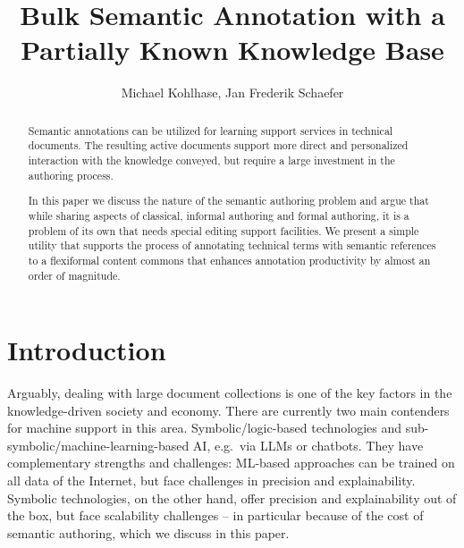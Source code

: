 \documentclass{llncs}
\title{Bulk Semantic Annotation with a Partially Known Knowledge Base\ednote{
    Too \snify specific...
}}
\author{Michael Kohlhase, Jan Frederik Schaefer}
\institute{Computer Science, FAU Erlangen N\"urnberg, Germany}
\begin{document}
\maketitle
\begin{abstract}
  Semantic annotations can be utilized for learning support services in technical
  documents. The resulting active documents support more direct and personalized
  interaction with the knowledge conveyed, but require a large investment in the authoring
  process.

  In this paper we discuss the nature of the semantic authoring problem and argue that
  while sharing aspects of classical, informal authoring and formal authoring, it is a
  problem of its own that needs special editing support facilities. We present a simple
  utility that supports the process of annotating technical terms with semantic references
  to a flexiformal content commons that enhances annotation productivity by almost an
  order of magnitude.
\end{abstract}

\section{Introduction}
Arguably, dealing with large document collections is one of the key factors in the knowledge-driven society and economy.
There are currently two main contenders for machine support in this area.
Symbolic/logic-based technologies and sub-symbolic/machine-learning-based AI, e.g.\ via LLMs or chatbots.
They have complementary strengths and challenges:
ML-based approaches can be trained on all data of the Internet, but face challenges in precision and explainability. 
Symbolic technologies, on the other hand, offer precision and explainability out of the box, but face scalability challenges
-- in particular because of the cost of semantic authoring, which we discuss in this paper.
\end{document}
